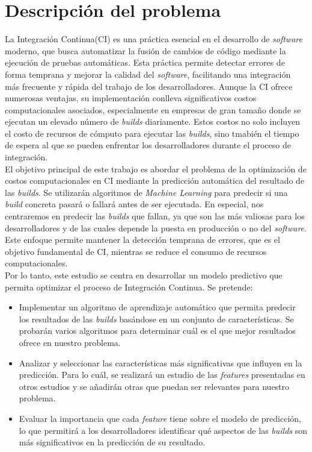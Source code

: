\section{Descripción del problema}
La Integración Continua(CI) es una práctica esencial en el desarrollo de \textit{software}
moderno, que busca automatizar la fusión de cambios de código mediante la ejecución de pruebas
automáticas. Esta práctica permite detectar errores de forma temprana y mejorar la calidad del
\textit{software}, facilitando una integración más frecuente y rápida del trabajo de los
desarrolladores. Aunque la CI ofrece numerosas ventajas, su implementación conlleva
significativos costos computacionales asociados, especialmente en empresas de gran tamaño donde
se ejecutan un elevado número de \textit{builds} diariamente. Estos costos no solo incluyen el
costo de recursos de cómputo para ejecutar las \textit{builds}, sino tmabién el tiempo de espera
al que se pueden enfrentar los desarrolladores durante el proceso de integración. \\

El objetivo principal de este trabajo es abordar el problema de la optimización de costos
computacionales en CI mediante la predicción automática del resultado de las
\textit{builds}. Se utilizarán algoritmos de \textit{Machine Learning} para predecir si una
\textit{build} concreta pasará o fallará antes de ser ejecutada. En especial, nos centraremos
en predecir las \textit{builds} que fallan, ya que son las más valiosas para los desarrolladores
y de las cuales depende la puesta en producción o no del \textit{software}. Este enfoque
permite mantener la detección temprana de errores, que es el objetivo fundamental de CI,
mientras se reduce el consumo de recursos computacionales.\\

Por lo tanto, este estudio se centra en desarrollar un modelo predictivo que permita optimizar
el proceso de Integración Continua. Se pretende:

\begin{itemize}
    \item Implementar un algoritmo de aprendizaje automático que permita predecir los resultados
    de las \textit{builds} basándose en un conjunto de características. Se probarán varios
    algoritmos para determinar cuál es el que mejor resultados ofrece en nuestro problema.\\
    \item Analizar y seleccionar las características más significativas que influyen en la
    predicción. Para lo cuál, se realizará un estudio de las \textit{features} presentadas en
    otros estudios y se añadirán otras que puedan ser relevantes para nuestro problema.\\
    \item Evaluar la importancia que cada \textit{feature} tiene sobre el modelo de predicción, lo
    que permitirá a los desarrolladores identificar qué aspectos de las \textit{builds} son
    más significativos en la predicción de su resultado.
\end{itemize}
